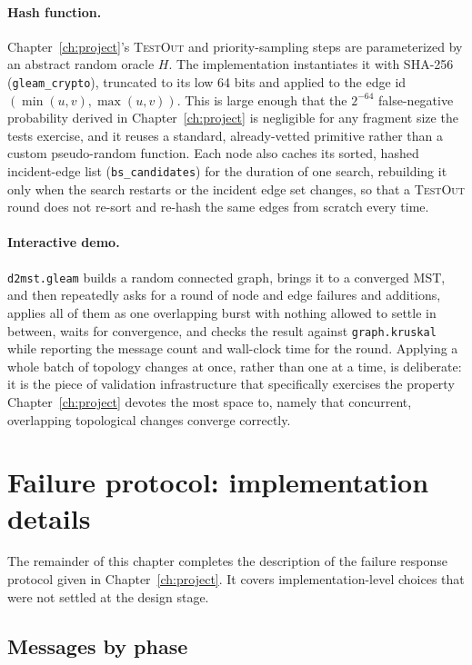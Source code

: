 \paragraph{Hash function.}
Chapter~\ref{ch:project}'s \textsc{TestOut} and priority-sampling steps are parameterized
by an abstract random oracle $H$. The implementation instantiates it with SHA-256
(\texttt{gleam\_crypto}), truncated to its low 64 bits and applied to the edge id
$(\min(u,v), \max(u,v))$. This is large enough that the $2^{-64}$ false-negative
probability derived in Chapter~\ref{ch:project} is negligible for any fragment size the
tests exercise, and it reuses a standard, already-vetted primitive rather than a custom
pseudo-random function. Each node also caches its sorted, hashed incident-edge list
(\texttt{bs\_candidates}) for the duration of one search, rebuilding it only when the
search restarts or the incident edge set changes, so that a \textsc{TestOut} round does
not re-sort and re-hash the same edges from scratch every time.


\paragraph{Interactive demo.}\label{sec:interactive-main}

\texttt{d2mst.gleam} builds a random connected graph, brings it to a converged MST, and
then repeatedly asks for a round of node and edge failures and additions, applies all of
them as one overlapping burst with nothing allowed to settle in between, waits for
convergence, and checks the result against \texttt{graph.kruskal} while reporting the
message count and wall-clock time for the round. Applying a whole batch of topology
changes at once, rather than one at a time, is deliberate: it is the piece of validation
infrastructure that specifically exercises the property Chapter~\ref{ch:project} devotes
the most space to, namely that concurrent, overlapping topological changes converge
correctly.

\section{Failure protocol: implementation details}

The remainder of this chapter completes the description of the failure response protocol
given in Chapter~\ref{ch:project}. It covers implementation-level choices that were not
settled at the design stage.

\subsection{Messages by phase}\label{sec:failure-messages}

